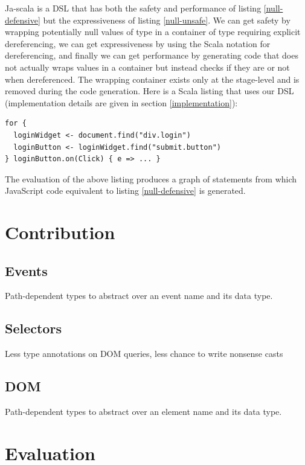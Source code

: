 \documentclass[runningheads,a4paper]{llncs}
\begin{document}
Ja-scala is a DSL that has both the safety and performance of listing \ref{null-defensive} but the
expressiveness of listing \ref{null-unsafe}. We can get safety by wrapping potentially null values of type
 in a container of type  requiring explicit dereferencing, we can get
expressiveness by using the Scala  notation for dereferencing, and finally we can get performance by
generating code that does not actually wraps values in a container but instead checks if they are  or not
when dereferenced. The wrapping container exists only at the stage-level and is removed during the code generation.
Here is a Scala listing that uses our DSL (implementation details are given in section \ref{implementation}):

\begin{lstlisting}
for {
  loginWidget <- document.find("div.login")
  loginButton <- loginWidget.find("submit.button")
} loginButton.on(Click) { e => ... }
\end{lstlisting}

The evaluation of the above listing produces a graph of statements from which JavaScript code equivalent to
listing \ref{null-defensive} is generated.

\section{Contribution}

\subsection{Events}

Path-dependent types to abstract over an event name and its data type.

\subsection{Selectors}

Less type annotations on DOM queries, less chance to write nonsense casts

\subsection{DOM}

Path-dependent types to abstract over an element name and its data type.

\section{Evaluation}
\end{document}
